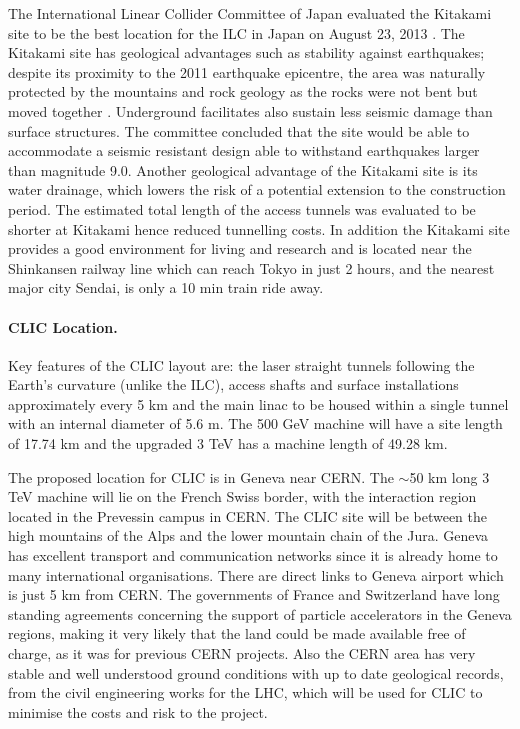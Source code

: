 The International Linear Collider Committee of Japan evaluated the Kitakami site to be the best location for the ILC in Japan on August 23, 2013 \cite{LCC:Press3}. The Kitakami site has geological advantages such as stability against earthquakes; despite its proximity to the 2011 earthquake epicentre, the area was naturally protected by the mountains and rock geology as the rocks were not bent but moved together \cite{Japan}. Underground facilitates also sustain less seismic damage than surface structures. The committee concluded that the site would be able to accommodate a seismic resistant design able to withstand earthquakes larger than magnitude 9.0. Another geological advantage of the Kitakami site is its water drainage, which lowers the risk of a potential extension to the construction period. The estimated total length of the access tunnels was evaluated to be shorter at Kitakami hence reduced tunnelling costs. In addition \cite{ILC:FundingAgencies} the Kitakami site provides a good environment for living and research and is located near the Shinkansen railway line which can reach Tokyo in just 2 hours, and the nearest major city Sendai, is only a 10 min train ride away.

\paragraph{CLIC Location.}

Key features of the CLIC layout are: the laser straight tunnels following the Earth's curvature (unlike the ILC), access shafts and surface installations approximately every 5 km and the main linac to be housed within a single tunnel with an internal diameter of 5.6 m. The 500 GeV machine will have a site length of 17.74 km and the upgraded 3 TeV has a machine length of 49.28 km. \cite{CLIC:Concept}

The proposed location for CLIC is in Geneva near CERN. The $\sim$50 km long 3 TeV machine will lie on the French \textendash Swiss border, with the interaction region located in the Prevessin campus in CERN. The CLIC site will be between the high mountains of the Alps and the lower mountain chain of the Jura. Geneva has excellent transport and communication networks since it is already home to many international organisations. There are direct links to Geneva airport which is just 5 km from CERN. The governments of France and Switzerland have long standing agreements concerning the support of particle accelerators in the Geneva regions, making it very likely that the land could be made available free of charge, as it was for previous CERN projects. Also the CERN area has very stable and well understood ground conditions with up to date geological records, from the civil engineering works for the LHC, which will be used for CLIC to minimise the costs and risk to the project.

